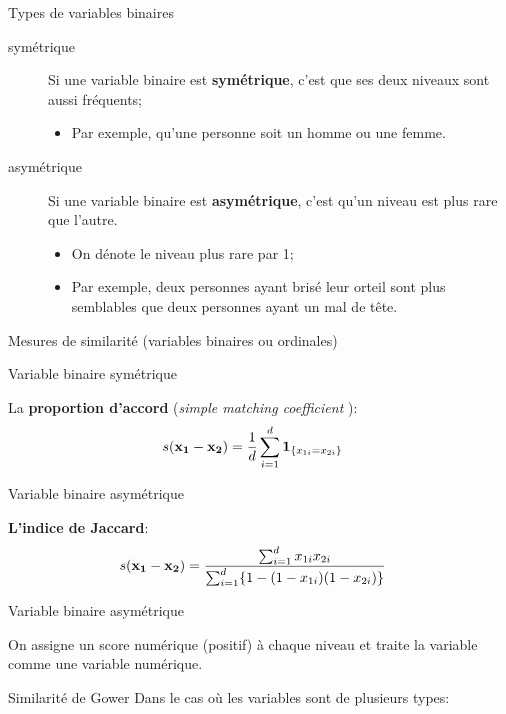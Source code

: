\documentclass[10pt, french]{article}
\begin{document}
\begin{multicols*}{3}
\begin{conceptgen}{Types de variables binaires}
\begin{description}
	\item[symétrique]	Si une variable binaire est \textbf{symétrique}, c'est que ses deux niveaux sont aussi fréquents;
		\begin{itemize}[leftmargin = *]
		\item	Par exemple, qu'une personne soit un homme ou une femme.
		\end{itemize}
	\item[asymétrique]	Si une variable binaire est \textbf{asymétrique}, c'est qu'un niveau est plus rare que l'autre.
		\begin{itemize}[leftmargin = *]
		\item	On dénote le niveau plus rare par 1;
		\item	Par exemple, deux personnes ayant brisé leur orteil sont plus semblables que deux personnes ayant un mal de tête.
		\end{itemize}
\end{description}
\end{conceptgen}

\begin{conceptgen}{Mesures de similarité (variables binaires ou ordinales)}
\begin{center}
	Variable binaire symétrique
\end{center}
La \textbf{proportion d'accord} (\og \textit{simple matching coefficient} \fg{}):
\begin{align*}
	s(\mathbf{x_{1} - x_{2}})
	&=	\frac{1}{d}	\sum_{i = 1}^{d} \bm{1}_{\{x_{1i} = x_{2i}\}}
\end{align*}
\tcbline
\begin{center}
	Variable binaire asymétrique
\end{center}
\textbf{L'indice de Jaccard}:
\begin{align*}
	s(\mathbf{x_{1} - x_{2}})
	&=	\frac{\sum_{i = 1}^{d} x_{1i}x_{2i}}{\sum_{i = 1}^{d} \{1 - (1 - x_{1i})(1 - x_{2i})\}}
\end{align*}
\tcbline
\begin{center}
	Variable binaire asymétrique
\end{center}
On assigne un score numérique (positif) à chaque niveau et traite la variable comme une variable numérique.
\end{conceptgen}

\begin{conceptgen}{Similarité de Gower}
Dans le cas où les variables sont de plusieurs types:
\setlength{\mathindent}{-1cm}


\end{conceptgen}
\end{multicols*}
\end{document}
